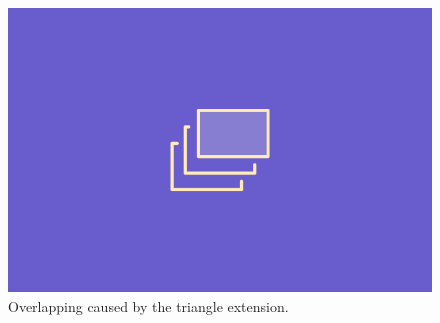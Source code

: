 \documentclass{PoliMi_MasterThesis}
\begin{document}
\begin{figure}[H]
	\centering
	\includegraphics[width=\textwidth*\real{0.6}]{Images/TODO.png}
	\caption{Overlapping caused by the triangle extension.}
	\label{fig:triangle_splitting_extension}
\end{figure}
\end{document}
